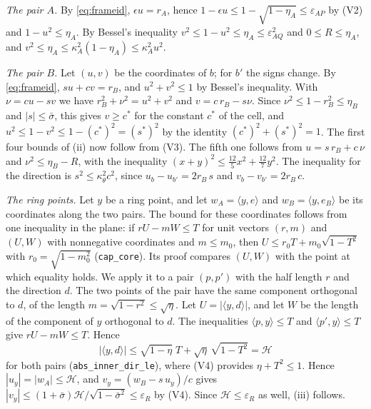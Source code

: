 \documentclass[reqno,a4paper,11pt]{amsart}
\numberwithin{equation}{section}
\newcommand{\lean}[1]{\texttt{#1}}
\begin{document}
\emph{The pair $A$.} By \eqref{eq:frameid}, $\epsilon u = r_A$, hence $1 - \epsilon u \leq 1 - \sqrt{1 - \eta_A} \leq \varepsilon_{AP}$ by (V2) and $1 - u^2 \leq \eta_A$. By Bessel's inequality $v^2 \leq 1 - u^2 \leq \eta_A \leq \varepsilon_{AQ}^2$ and $0 \leq R \leq \eta_A$, and $v^2 \leq \eta_A \leq \kappa_A^2 (1 - \eta_A) \leq \kappa_A^2 u^2$.

\emph{The pair $B$.} Let $(u, v)$ be the coordinates of $b$; for $b'$ the signs change. By \eqref{eq:frameid}, $s u + c v = r_B$, and $u^2 + v^2 \leq 1$ by Bessel's inequality. With $\nu = c u - s v$ we have $r_B^2 + \nu^2 = u^2 + v^2$ and $v = c \, r_B - s \nu$. Since $\nu^2 \leq 1 - r_B^2 \leq \eta_B$ and $|s| \leq \bar\sigma$, this gives $v \geq c^*$ for the constant $c^*$ of the cell, and $u^2 \leq 1 - v^2 \leq 1 - (c^*)^2 = (s^*)^2$ by the identity $(c^*)^2 + (s^*)^2 = 1$. The first four bounds of (ii) now follow from (V3). The fifth one follows from $u = s \, r_B + c \, \nu$ and $\nu^2 \leq \eta_B - R$, with the inequality $(x + y)^2 \leq \tfrac{12}{5} x^2 + \tfrac{12}{7} y^2$. The inequality for the direction is $s^2 \leq \kappa_\theta^2 c^2$, since $u_b - u_{b'} = 2 r_B \, s$ and $v_b - v_{b'} = 2 r_B \, c$.

\emph{The ring points.} Let $y$ be a ring point, and let $w_A = \langle y, e \rangle$ and $w_B = \langle y, e_B \rangle$ be its coordinates along the two pairs. The bound for these coordinates follows from one inequality in the plane: if $r U - m W \leq T$ for unit vectors $(r, m)$ and $(U, W)$ with nonnegative coordinates and $m \leq m_0$, then $U \leq r_0 T + m_0 \sqrt{1 - T^2}$ with $r_0 = \sqrt{1 - m_0^2}$ (\lean{cap\_core}). Its proof compares $(U, W)$ with the point at which equality holds. We apply it to a pair $(p, p')$ with the half length $r$ and the direction $d$. The two points of the pair have the same component orthogonal to $d$, of the length $m = \sqrt{1 - r^2} \leq \sqrt{\eta}$. Let $U = |\langle y, d \rangle|$, and let $W$ be the length of the component of $y$ orthogonal to $d$. The inequalities $\langle p, y \rangle \leq T$ and $\langle p', y \rangle \leq T$ give $r U - m W \leq T$. Hence
$$
|\langle y, d \rangle| \leq \sqrt{1 - \eta} \; T + \sqrt{\eta} \, \sqrt{1 - T^2} = \mathcal{H}
$$
for both pairs (\lean{abs\_inner\_dir\_le}), where (V4) provides $\eta + T^2 \leq 1$. Hence $|u_y| = |w_A| \leq \mathcal{H}$, and $v_y = (w_B - s \, u_y)/c$ gives $|v_y| \leq (1 + \bar\sigma) \mathcal{H} / \sqrt{1 - \bar\sigma^2} \leq \varepsilon_R$ by (V4). Since $\mathcal{H} \leq \varepsilon_R$ as well, (iii) follows.
\end{document}
